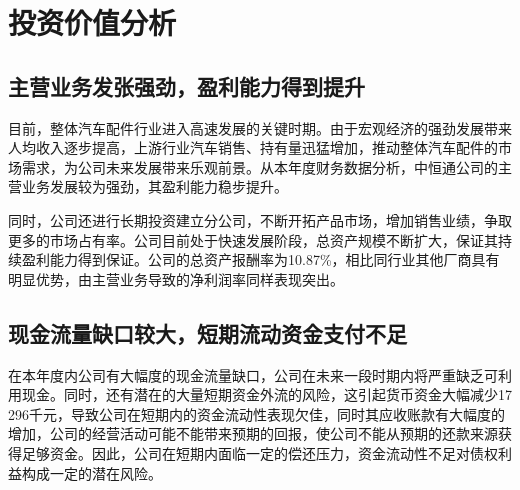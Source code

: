 
\chapter{投资价值分析}{}
\label{chap04}

\section{主营业务发张强劲，盈利能力得到提升}{}
目前，整体汽车配件行业进入高速发展的关键时期。由于宏观经济的强劲发展带来人均收入逐步提高，上游行业汽车销售、持有量迅猛增加，推动整体汽车配件的市场需求，为公司未来发展带来乐观前景。从本年度财务数据分析，中恒通公司的主营业务发展较为强劲，其盈利能力稳步提升。

同时，公司还进行长期投资建立分公司，不断开拓产品市场，增加销售业绩，争取更多的市场占有率。公司目前处于快速发展阶段，总资产规模不断扩大，保证其持续盈利能力得到保证。公司的总资产报酬率为10.87\%，相比同行业其他厂商具有明显优势，由主营业务导致的净利润率同样表现突出。

\section{现金流量缺口较大，短期流动资金支付不足}{}
在本年度内公司有大幅度的现金流量缺口，公司在未来一段时期内将严重缺乏可利用现金。同时，还有潜在的大量短期资金外流的风险，这引起货币资金大幅减少17 296千元，导致公司在短期内的资金流动性表现欠佳，同时其应收账款有大幅度的增加，公司的经营活动可能不能带来预期的回报，使公司不能从预期的还款来源获得足够资金。因此，公司在短期内面临一定的偿还压力，资金流动性不足对债权利益构成一定的潜在风险。



